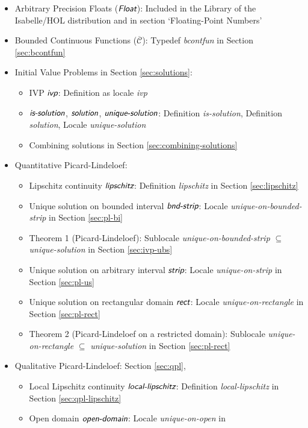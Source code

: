 \documentclass[11pt,a4paper]{article}
\newcommand{\bcontfun}{\ensuremath{\mathcal{\overline{C}}}}
\newcommand{\keyword}[1]{\ensuremath{\textsl{\textsf{#1}}}}
\newcommand{\Kunique}[1]{\ensuremath{\keyword{#1}}}
\newcommand{\KFloat}{\keyword{Float}}
\newcommand{\Kissolution}{\keyword{is-solution}}
\newcommand{\Kivp}{\keyword{ivp}}
\newcommand{\Klipschitz}{\keyword{lipschitz}}
\newcommand{\Klipschitzl}{\keyword{local-lipschitz}}
\newcommand{\Ksolution}{\keyword{solution}}
\newcommand{\Kusolution}{\keyword{unique-solution}}
\newcommand{\Kubinterval}{\Kunique{bnd-strip}}
\newcommand{\Kuinterval}{\Kunique{strip}}
\newcommand{\Kurectangle}{\Kunique{rect}}
\newcommand{\Kuopen}{\Kunique{open-domain}}
\begin{document}
\begin{itemize}
\item Arbitrary Precision Floats ($\KFloat$): Included in the Library of the
  Isabelle/HOL distribution and in section `Floating-Point Numbers'
\item Bounded Continuous Functions ($\bcontfun$): Typedef \textit{bcontfun}
  in Section \ref{sec:bcontfun}
\item Initial Value Problems in Section \ref{sec:solutions}:
  \begin{itemize}
  \item IVP $\Kivp$: Definition as locale \textit{ivp}
  \item $\Kissolution$, $\Ksolution$, $\Kusolution$: Definition
    \textit{is-solution}, Definition \textit{solution}, Locale
    \textit{unique-solution}
  \item Combining solutions in Section \ref{sec:combining-solutions}
  \end{itemize}
\item Quantitative Picard-Lindeloef:
  \begin{itemize}
  \item Lipschitz continuity $\Klipschitz$: Definition
    \textit{lipschitz} in Section \ref{sec:lipschitz}
  \item Unique solution on bounded interval $\Kubinterval$: Locale
    \textit{unique-on-bounded-strip} in Section \ref{sec:pl-bi}
  \item Theorem 1 (Picard-Lindeloef): Sublocale
    \textit{unique-on-bounded-strip} $\subseteq$
    \textit{unique-solution} in Section \ref{sec:ivp-ubs}
  \item Unique solution on arbitrary interval $\Kuinterval$: Locale
    \textit{unique-on-strip} in Section \ref{sec:pl-us}
  \item Unique solution on rectangular domain $\Kurectangle$: Locale
    \textit{unique-on-rectangle} in Section \ref{sec:pl-rect}
  \item Theorem 2 (Picard-Lindeloef on a restricted domain): Sublocale
    \textit{unique-on-rectangle} $\subseteq$
    \textit{unique-solution} in Section \ref{sec:pl-rect}
 \end{itemize}
\item Qualitative Picard-Lindeloef: Section \ref{sec:qpl},
 \begin{itemize}
  \item Local Lipschitz continuity $\Klipschitzl$: Definition
    \textit{local-lipschitz} in Section \ref{sec:qpl-lipschitz}
  \item Open domain $\Kuopen$: Locale \textit{unique-on-open} in

\end{itemize}
\end{itemize}
\end{document}

